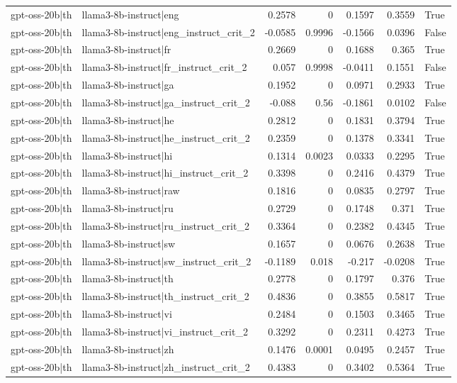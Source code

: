 \begin{table}
\begin{tabular}{l l r r r r l}
gpt-oss-20b|th & llama3-8b-instruct|eng & 0.2578 & 0 & 0.1597 & 0.3559 & True \\
gpt-oss-20b|th & llama3-8b-instruct|eng_instruct_crit_2 & -0.0585 & 0.9996 & -0.1566 & 0.0396 & False \\
gpt-oss-20b|th & llama3-8b-instruct|fr & 0.2669 & 0 & 0.1688 & 0.365 & True \\
gpt-oss-20b|th & llama3-8b-instruct|fr_instruct_crit_2 & 0.057 & 0.9998 & -0.0411 & 0.1551 & False \\
gpt-oss-20b|th & llama3-8b-instruct|ga & 0.1952 & 0 & 0.0971 & 0.2933 & True \\
gpt-oss-20b|th & llama3-8b-instruct|ga_instruct_crit_2 & -0.088 & 0.56 & -0.1861 & 0.0102 & False \\
gpt-oss-20b|th & llama3-8b-instruct|he & 0.2812 & 0 & 0.1831 & 0.3794 & True \\
gpt-oss-20b|th & llama3-8b-instruct|he_instruct_crit_2 & 0.2359 & 0 & 0.1378 & 0.3341 & True \\
gpt-oss-20b|th & llama3-8b-instruct|hi & 0.1314 & 0.0023 & 0.0333 & 0.2295 & True \\
gpt-oss-20b|th & llama3-8b-instruct|hi_instruct_crit_2 & 0.3398 & 0 & 0.2416 & 0.4379 & True \\
gpt-oss-20b|th & llama3-8b-instruct|raw & 0.1816 & 0 & 0.0835 & 0.2797 & True \\
gpt-oss-20b|th & llama3-8b-instruct|ru & 0.2729 & 0 & 0.1748 & 0.371 & True \\
gpt-oss-20b|th & llama3-8b-instruct|ru_instruct_crit_2 & 0.3364 & 0 & 0.2382 & 0.4345 & True \\
gpt-oss-20b|th & llama3-8b-instruct|sw & 0.1657 & 0 & 0.0676 & 0.2638 & True \\
gpt-oss-20b|th & llama3-8b-instruct|sw_instruct_crit_2 & -0.1189 & 0.018 & -0.217 & -0.0208 & True \\
gpt-oss-20b|th & llama3-8b-instruct|th & 0.2778 & 0 & 0.1797 & 0.376 & True \\
gpt-oss-20b|th & llama3-8b-instruct|th_instruct_crit_2 & 0.4836 & 0 & 0.3855 & 0.5817 & True \\
gpt-oss-20b|th & llama3-8b-instruct|vi & 0.2484 & 0 & 0.1503 & 0.3465 & True \\
gpt-oss-20b|th & llama3-8b-instruct|vi_instruct_crit_2 & 0.3292 & 0 & 0.2311 & 0.4273 & True \\
gpt-oss-20b|th & llama3-8b-instruct|zh & 0.1476 & 0.0001 & 0.0495 & 0.2457 & True \\
gpt-oss-20b|th & llama3-8b-instruct|zh_instruct_crit_2 & 0.4383 & 0 & 0.3402 & 0.5364 & True \\

\end{tabular}
\end{table}
